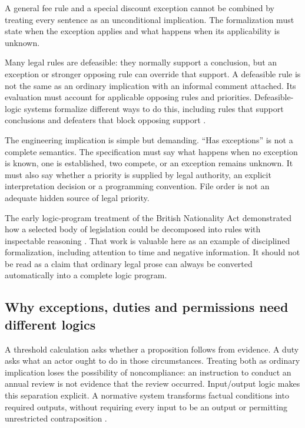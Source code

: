 \documentclass[12pt,a4paper,oneside,openany]{book}
\begin{document}
A general fee rule and a special discount exception cannot be combined by treating every sentence as an unconditional implication. The formalization must state when the exception applies and what happens when its applicability is unknown.


Many legal rules are defeasible: they normally support a conclusion, but an
exception or stronger opposing rule can override that support. A defeasible
rule is not the same as an ordinary implication with an informal comment
attached. Its evaluation must account for applicable opposing rules and
priorities. Defeasible-logic systems formalize different ways to do this,
including rules that support conclusions and defeaters that block opposing
support \citep[sec.~2]{defeasible2000}.

The engineering implication is simple but demanding. ``Has exceptions'' is
not a complete semantics. The specification must say what happens when no
exception is known, one is established, two compete, or an exception remains
unknown. It must also say whether a priority is supplied by legal authority,
an explicit interpretation decision or a programming convention. File order
is not an adequate hidden source of legal priority.

The early logic-program treatment of the British Nationality Act demonstrated
how a selected body of legislation could be decomposed into rules with
inspectable reasoning \citep{sergot1986}. That work is valuable here as an
example of disciplined formalization, including attention to time and negative
information. It should not be read as a claim that ordinary legal prose can
always be converted automatically into a complete logic program.

\subsection{Why exceptions, duties and permissions need different logics}
\label{merge:P-02a-foundations:00}


A threshold calculation asks whether a proposition follows from evidence. A duty
asks what an actor ought to do in those circumstances. Treating both as ordinary
implication loses the possibility of noncompliance: an instruction to conduct an
annual review is not evidence that the review occurred. Input/output logic makes
this separation explicit. A normative system transforms factual conditions into
required outputs, without requiring every input to be an output or permitting
unrestricted contraposition \citep[secs.~2--3]{inputoutput2000}.
\end{document}
